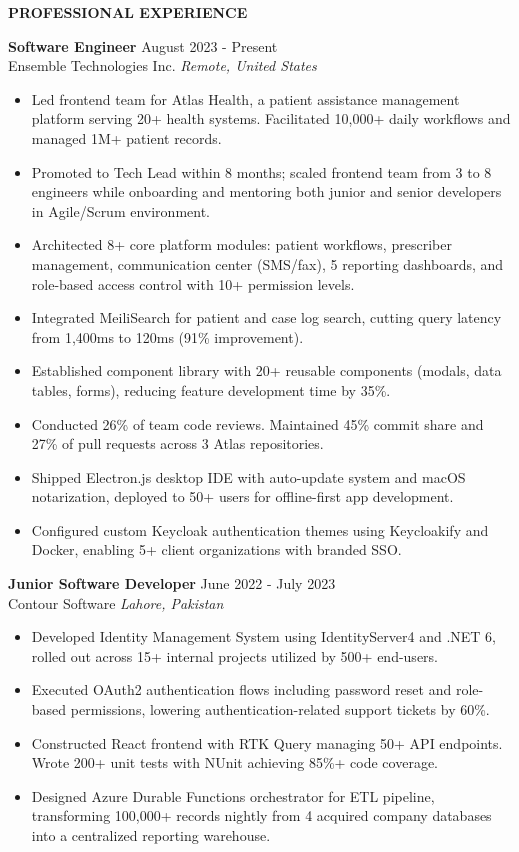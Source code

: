 \documentclass{resume} %
\newcommand{\largeSection}[1]{\textbf{\Large #1}}
\begin{document}
\begin{rSection}{\largeSection{PROFESSIONAL EXPERIENCE}}

\textbf{Software Engineer} \hfill August 2023 - Present\\
Ensemble Technologies Inc. \hfill \textit{Remote, United States}
 \begin{itemize}
    \itemsep -3pt {} 
     \item Led frontend team for Atlas Health, a patient assistance management platform serving 20+ health systems. Facilitated 10,000+ daily workflows and managed 1M+ patient records.
     \item Promoted to Tech Lead within 8 months; scaled frontend team from 3 to 8 engineers while onboarding and mentoring both junior and senior developers in Agile/Scrum environment.
     \item Architected 8+ core platform modules: patient workflows, prescriber management, communication center (SMS/fax), 5 reporting dashboards, and role-based access control with 10+ permission levels.
     \item Integrated MeiliSearch for patient and case log search, cutting query latency from 1,400ms to 120ms (91\% improvement).
     \item Established component library with 20+ reusable components (modals, data tables, forms), reducing feature development time by 35\%.
     \item Conducted 26\% of team code reviews. Maintained 45\% commit share and 27\% of pull requests across 3 Atlas repositories.
     \item Shipped Electron.js desktop IDE with auto-update system and macOS notarization, deployed to 50+ users for offline-first app development.
     \item Configured custom Keycloak authentication themes using Keycloakify and Docker, enabling 5+ client organizations with branded SSO.
 \end{itemize}
 
\textbf{Junior Software Developer} \hfill June 2022 - July 2023\\
Contour Software \hfill \textit{Lahore, Pakistan}
 \begin{itemize}
    \itemsep -3pt {} 
     \item Developed Identity Management System using IdentityServer4 and .NET 6, rolled out across 15+ internal projects utilized by 500+ end-users.
     \item Executed OAuth2 authentication flows including password reset and role-based permissions, lowering authentication-related support tickets by 60\%.
     \item Constructed React frontend with RTK Query managing 50+ API endpoints. Wrote 200+ unit tests with NUnit achieving 85\%+ code coverage.
     \item Designed Azure Durable Functions orchestrator for ETL pipeline, transforming 100,000+ records nightly from 4 acquired company databases into a centralized reporting warehouse.
 \end{itemize}

\end{rSection} 
\end{document}
